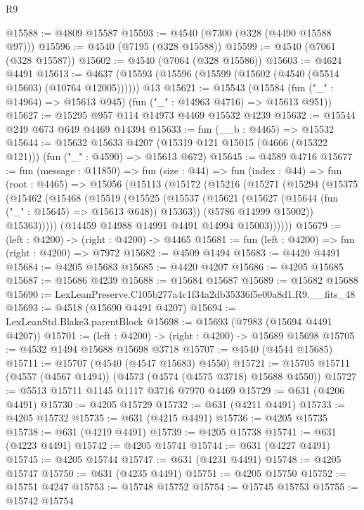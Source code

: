 \begin{lexlean}{R9}
\begin{coremodule}
@15588 := @4809 @15587
@15593 := @4540 (@7300 (@328 (@4490 @15588 @97)))
@15596 := @4540 (@7195 (@328 @15588))
@15599 := @4540 (@7061 (@328 @15587))
@15602 := @4540 (@7064 (@328 @15586))
@15603 := @4624 @4491
@15613 := @4637 (@15593 (@15596 (@15599 (@15602 (@4540 (@5514 @15603) (@10764 @12005)))))) @13
@15621 := @15543
    (@15584 (fun ("_" : @14964) => @15613 @945) (fun ("_" : @14963 @4716) => @15613 @951))
@15627 := @15295 @957 @114 @14973 @4469 @15532 @4239
@15632 := @15544 @249 @673 @649 @4469 @14394
@15633 := fun (__b : @4465) => @15532
@15644 := @15632
    @15633
    @4207
    (@15319 @121 @15015 (@4666 (@15322 @121)))
    (fun ("_" : @4590) => @15613 @672)
@15645 := @4589 @4716
@15677 := fun (message : @11850) =>
  fun (size : @44) =>
  fun (index : @44) =>
  fun (root : @4465) =>
  @15056
    (@15113
      (@15172
        (@15216
          (@15271
            (@15294
              (@15375
                (@15462
                  (@15468
                    (@15519
                      (@15525
                        (@15537
                          (@15621 (@15627 (@15644 (fun ("_" : @15645) => @15613 @648)) @15363))
                          (@5786 @14999 @15002))
                        @15363)))))
              (@14459 @14988 @14991 @4491 @14994 @15003))))))
@15679 := (left : @4200) -> (right : @4200) -> @4465
@15681 := fun (left : @4200) => fun (right : @4200) => @7972
@15682 := @4509 @1494
@15683 := @4420 @4491
@15684 := @4205 @15683
@15685 := @4420 @4207
@15686 := @4205 @15685
@15687 := @15686 @4239
@15688 := @15684 @15687
@15689 := @15682 @15688
@15690 := LexLeanPreserve.C105b277a4c1f34a2db35336f5e00a8d1.R9.__fits_48
@15693 := @4518 (@15690 @4491 @4207)
@15694 := LexLeanStd.Blake3.parentBlock
@15698 := @15693 (@7983 (@15694 @4491 @4207))
@15701 := (left : @4200) -> (right : @4200) -> @15689 @15698
@15705 := @4532 @1494 @15688 @15698 @3718
@15707 := @4540 (@4544 @15685)
@15711 := @15707 (@4540 (@4547 @15683) @4550)
@15721 := @15705 @15711 (@4557 (@4567 @1494)) (@4573 (@4574 (@4575 @3718) @15688 @4550))
@15727 := @5513 @15711 @1145 @1117 @3716 @7970 @4469
@15729 := @631 (@4206 @4491)
@15730 := @4205 @15729
@15732 := @631 (@4211 @4491)
@15733 := @4205 @15732
@15735 := @631 (@4215 @4491)
@15736 := @4205 @15735
@15738 := @631 (@4219 @4491)
@15739 := @4205 @15738
@15741 := @631 (@4223 @4491)
@15742 := @4205 @15741
@15744 := @631 (@4227 @4491)
@15745 := @4205 @15744
@15747 := @631 (@4231 @4491)
@15748 := @4205 @15747
@15750 := @631 (@4235 @4491)
@15751 := @4205 @15750
@15752 := @15751 @4247
@15753 := @15748 @15752
@15754 := @15745 @15753
@15755 := @15742 @15754

\end{coremodule}
\end{lexlean}
